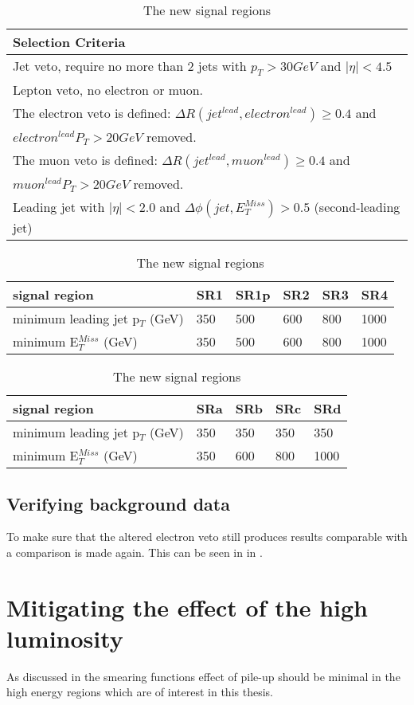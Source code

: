 \begin{table}[h]
\begin{center}
\begin{tabular}{l}
\hline
Selection Criteria \\ \hline
Jet veto, require no more than 2 jets with $p_T > 30 GeV$ and $|\eta| < 4.5$ \\
Lepton veto, no electron or muon. \\
The electron veto is defined: $\Delta R (jet^{lead},electron^{lead})\geq 0.4$ and \\
$electron^{lead} P_T>20 GeV$ removed.\\
The muon veto is defined: $\Delta R (jet^{lead},muon^{lead})\geq 0.4$ and \\
$muon^{lead} P_T>20 GeV$ removed.\\
Leading jet with $|\eta| < 2.0$ and $\Delta \phi (jet, E_T^{Miss})>0.5$ (second-leading jet) \\ 
\end{tabular}
\begin{tabular}{l l l l l l}
\hline
signal region & SR1 & SR1p & SR2 & SR3 & SR4 \\ \hline
minimum leading jet p$_T$ (GeV) & 350 &500& 600 & 800 & 1000 \\
minimum E$^{Miss}_T$ (GeV) & 350&500 & 600 & 800 & 1000 \\
\end{tabular}
\begin{tabular}{l l l l l} \hline
signal region & SRa &  SRb & SRc & SRd \\ \hline
minimum leading jet p$_T$ (GeV) & 350 & 350 & 350 & 350 \\
minimum E$^{Miss}_T$ (GeV) & 350 & 600 & 800 & 1000 \\ \hline
\end{tabular}
\label{tab:newsr}
\caption{The new signal regions}
\end{center}
\end{table}

\subsection{Verifying background data}
To make sure that the altered electron veto still produces results comparable with \citep{ATLAS-CONF-2012-147} a comparison is made again. This can be seen in  in .

\section{Mitigating the effect of the high luminosity}
As discussed in  the smearing functions effect of pile-up should be minimal in the high energy regions which are of interest in this thesis. 

